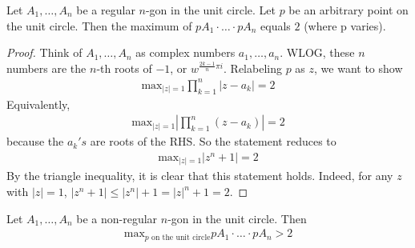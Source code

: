 \documentclass{memoir}
\begin{document}
\begin{thm}
	Let \(A_1,\ldots,A_n\) be a regular \(n\)-gon in the unit circle. Let \(p\) be an arbitrary point on the unit circle. Then the maximum of \(pA_1 \cdot \ldots \cdot pA_n\) equals \(2\) (where p varies).
\end{thm}

\begin{proof}
Think of \(A_1,\ldots,A_n\) as complex numbers \(a_1,\ldots,a_n\). WLOG, these \(n\) numbers are the \(n \)-th roots of \(-1\), or \(w^{\frac{2k-1}{n}\pi i}\). Relabeling \(p\) as \(z\), we want to show
\begin{align*}
	\textrm{max}_{|z|=1}\prod_{k=1}^{n} |z-a_k| = 2 
\end{align*}
Equivalently,
\begin{align*}
	\textrm{max}_{|z|=1}\left| \prod_{k=1}^{n} (z-a_k)  \right| = 2
\end{align*}because the \(a_k's\) are roots of the RHS.
So the statement reduces to
\begin{align*}
	\textrm{max}_{|z|=1} |z^{n}+1| = 2
\end{align*}
By the triangle inequality, it is clear that this statement holds. Indeed, for any \(z\) with \(|z| = 1\), \(|z^{n}+1| \leq |z^{n}| + 1 = |z|^{n}+1 = 2\). 
\end{proof}


\begin{thm}
	Let \(A_1,\ldots,A_n\) be a non-regular \(n\)-gon in the unit circle. Then
	\begin{align*}
		\textrm{max}_{p \text{ on the unit circle}} pA_1 \cdot \ldots\cdot pA_n > 2
	\end{align*}
\end{thm}
\end{document}
